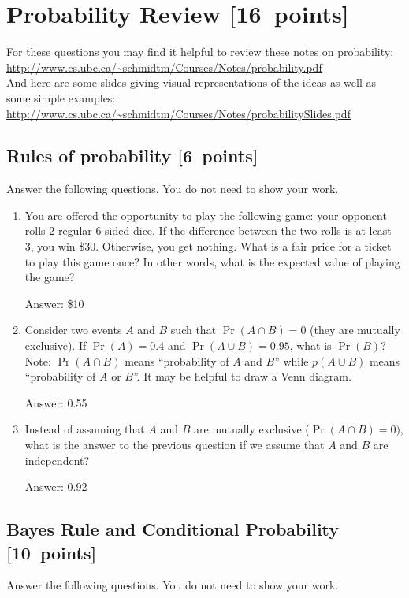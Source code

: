 \documentclass{article}
\newcommand{\blu}[1]{{\textcolor{blu}{#1}}}
\newcommand{\gre}[1]{\textcolor{gre}{#1}}
\newcommand\ans[1]{\par\gre{Answer: #1}}
\let\ask\blu
\newcommand\pts[1]{\textcolor{pointscolour}{[#1~points]}}
\begin{document}
  \clearpage\section{Probability Review \pts{16}}


  For these questions you may find it helpful to review these notes on probability:\\
  \url{http://www.cs.ubc.ca/~schmidtm/Courses/Notes/probability.pdf}\\
  And here are some slides giving visual representations of the ideas as well as some simple examples:\\
  \url{http://www.cs.ubc.ca/~schmidtm/Courses/Notes/probabilitySlides.pdf}

  \subsection{Rules of probability \pts{6}}

  \ask{Answer the following questions.} You do not need to show your work.

  \begin{enumerate}
  \item You are offered the opportunity to play the following game: your opponent rolls 2 regular 6-sided dice. If the difference between the two rolls is at least 3, you win \$30. Otherwise, you get nothing. What is a fair price for a ticket to play this game once? In other words, what is the expected value of playing the game?\ans{\$10}
  \item Consider two events $A$ and $B$ such that $\Pr(A \cap B)=0$ (they are mutually exclusive). If $\Pr(A) = 0.4$ and $\Pr(A \cup B) = 0.95$, what is $\Pr(B)$? Note: $\Pr(A \cap B)$ means
  ``probability of $A$ and $B$'' while $p(A \cup B)$ means ``probability of $A$ or $B$''. It may be helpful to draw a Venn diagram.
  \ans{0.55}
  \item Instead of assuming that $A$ and $B$ are mutually exclusive ($\Pr(A \cap B) = 0)$, what is the answer to the previous question if we assume that $A$ and $B$ are independent?
  \ans{0.92}


  \end{enumerate}

  \subsection{Bayes Rule and Conditional Probability \pts{10}}

  \ask{Answer the following questions.} You do not need to show your work.
\end{document}
